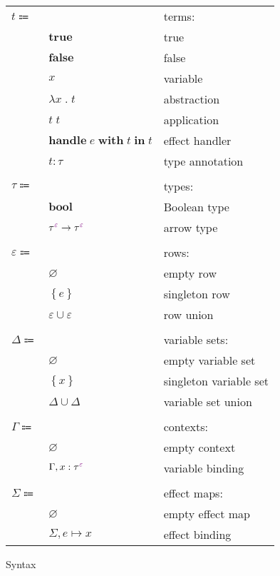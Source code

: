 \documentclass[12pt]{article}
\newcommand\anno[2]{#1 : #2}
\newcommand\term{t}
\newcommand\eTrue{\textbf{true}}
\newcommand\eFalse{\textbf{false}}
\newcommand\eVar{x}
\newcommand\eAbs[2]{\lambda #1 \; . \; #2}
\newcommand\eApp[2]{#1 \; #2}
\newcommand\eHandle[3]{\textbf{handle} \; #1 \; \textbf{with} \; #2 \; \textbf{in} \; #3}
\newcommand\eAnno[2]{\anno{#1}{#2}}
\newcommand\type{\tau}
\newcommand\tBool{\textbf{bool}}
\newcommand\tArrow[4]{\tEmbellished{#1}{#2} \rightarrow \tEmbellished{#3}{#4}}
\newcommand\tEmbellished[2]{{#1}^{\textcolor{violet}{#2}}}
\newcommand\row{\varepsilon}
\newcommand\rEmpty{\varnothing}
\newcommand\rSingleton[1]{\left\{ #1 \right\}}
\newcommand\rUnion[2]{#1 \cup #2}
\newcommand\varSet{\Delta}
\newcommand\vsSingleton[1]{\left\{ #1 \right\}}
\newcommand\vsEmpty{\varnothing}
\newcommand\vsUnion[2]{#1 \cup #2}
\newcommand\context{\Gamma}
\newcommand\cEmpty{\varnothing}
\newcommand\cExtend[4]{#1, \anno{#2}{\tEmbellished{#3}{#4}}}
\newcommand\effect{e}
\newcommand\effectMap{\Sigma}
\newcommand\emMap[2]{#1 \mapsto #2}
\newcommand\emEmpty{\varnothing}
\newcommand\emExtend[3]{#1, \emMap{#2}{#3}}
\begin{document}
      \begin{figure}[H]
        \begin{mdframed}[backgroundcolor=none]
          \begin{center}
            \begin{tabular}{l l l}
              $\term \Coloneqq$ & & terms: \\
              & $\eTrue$ & true \\
              & $\eFalse$ & false \\
              & $\eVar$ & variable \\
              & $\eAbs{\eVar}{\term}$ & abstraction \\
              & $\eApp{\term}{\term}$ & application \\
              & $\eHandle{\effect}{\term}{\term}$ & effect handler \\
              & $\eAnno{\term}{\type}$ & type annotation \\
              \\
              $\type \Coloneqq$ & & types: \\
              & $\tBool$ & Boolean type \\
              & $\tArrow{\type}{\row}{\type}{\row}$ & arrow type \\
              \\
              $\row \Coloneqq$ & & rows: \\
              & $\rEmpty$ & empty row \\
              & $\rSingleton{\effect}$ & singleton row \\
              & $\rUnion{\row}{\row}$ & row union \\
              \\
              $\varSet \Coloneqq$ & & variable sets: \\
              & $\vsEmpty$ & empty variable set \\
              & $\vsSingleton{\eVar}$ & singleton variable set \\
              & $\vsUnion{\varSet}{\varSet}$ & variable set union \\
              \\
              $\context \Coloneqq$ & & contexts: \\
              & $\cEmpty$ & empty context \\
              & $\cExtend{\context}{\eVar}{\type}{\row}$ & variable binding \\
              \\
              $\effectMap \Coloneqq$ & & effect maps: \\
              & $\emEmpty$ & empty effect map \\
              & $\emExtend{\effectMap}{\effect}{\eVar}$ & effect binding \\
            \end{tabular}
          \end{center}

          \caption{Syntax}\label{fig:syntax}
        \end{mdframed}
      \end{figure}
\end{document}
